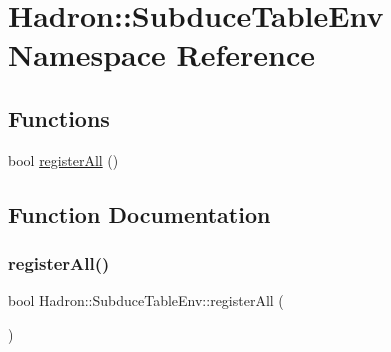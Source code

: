 \hypertarget{namespaceHadron_1_1SubduceTableEnv}{}\section{Hadron\+:\+:Subduce\+Table\+Env Namespace Reference}
\label{namespaceHadron_1_1SubduceTableEnv}
\subsection*{Functions}
\begin{DoxyCompactItemize}
\item 
bool \mbox{\hyperlink{namespaceHadron_1_1SubduceTableEnv_a168dd05273b8d8f0ca1cfb57fbe63e23}{register\+All}} ()
\end{DoxyCompactItemize}


\subsection{Function Documentation}
\mbox{\label{namespaceHadron_1_1SubduceTableEnv_a168dd05273b8d8f0ca1cfb57fbe63e23}} 
\subsubsection{\texorpdfstring{registerAll()}{registerAll()}}
{\footnotesize\ttfamily bool Hadron\+::\+Subduce\+Table\+Env\+::register\+All (\begin{DoxyParamCaption}{ }\end{DoxyParamCaption})}

